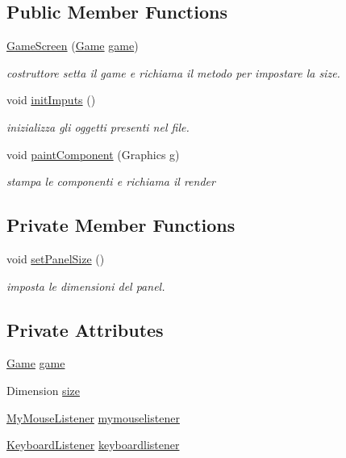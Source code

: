 \subsection*{Public Member Functions}
\begin{DoxyCompactItemize}
\item 
\hyperlink{classprogetto_1_1_game_screen_ab2b34a3390e240329bfdd0848fe5cd8c}{Game\+Screen} (\hyperlink{classprogetto_1_1_game}{Game} \hyperlink{classprogetto_1_1_game_screen_ac6a5ed6191fcf3a5bf0445921feb4f48}{game})
\begin{DoxyCompactList}\small\item\em costruttore setta il game e richiama il metodo per impostare la size. \end{DoxyCompactList}\item 
void \hyperlink{classprogetto_1_1_game_screen_a7427dec536138d79b67548cdacc03e4d}{init\+Imputs} ()
\begin{DoxyCompactList}\small\item\em inizializza gli oggetti presenti nel file. \end{DoxyCompactList}\item 
void \hyperlink{classprogetto_1_1_game_screen_aac9233d06f3c093fc37139d7d2b258f6}{paint\+Component} (Graphics g)
\begin{DoxyCompactList}\small\item\em stampa le componenti e richiama il render \end{DoxyCompactList}\end{DoxyCompactItemize}
\subsection*{Private Member Functions}
\begin{DoxyCompactItemize}
\item 
void \hyperlink{classprogetto_1_1_game_screen_aa43131fafd2ebfcce65253a669a29493}{set\+Panel\+Size} ()
\begin{DoxyCompactList}\small\item\em imposta le dimensioni del panel. \end{DoxyCompactList}\end{DoxyCompactItemize}
\subsection*{Private Attributes}
\begin{DoxyCompactItemize}
\item 
\hyperlink{classprogetto_1_1_game}{Game} \hyperlink{classprogetto_1_1_game_screen_ac6a5ed6191fcf3a5bf0445921feb4f48}{game}
\item 
Dimension \hyperlink{classprogetto_1_1_game_screen_a743d9d70d0b79689cc75dfc44137cc48}{size}
\item 
\hyperlink{classinputs_1_1_my_mouse_listener}{My\+Mouse\+Listener} \hyperlink{classprogetto_1_1_game_screen_a5990832ea95558f0014221f27355da08}{mymouselistener}
\item 
\hyperlink{classinputs_1_1_keyboard_listener}{Keyboard\+Listener} \hyperlink{classprogetto_1_1_game_screen_a670214f8f43798ec99bd2cc57bdeacd1}{keyboardlistener}
\end{DoxyCompactItemize}


